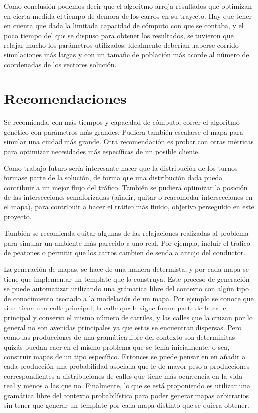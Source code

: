 \documentclass[colorinlistoftodos,twoside,twocolumn]{article} %
\begin{document}
	Como conclusi\'on podemos decir que el algoritmo arroja resultados que optimizan en cierta medida el tiempo de demora de los carros en su trayecto. Hay que tener en cuenta que dada la limitada capacidad de c\'omputo con que se contaba, y el poco tiempo del que se dispuso para obtener los resultados, se tuvieron que relajar mucho los par\'ametros utilizados. Idealmente deber\'ian haberse corrido simulaciones m\'as largas y con un tama\~no de poblaci\'on m\'as acorde al n\'umero de coordenadas de los vectores soluci\'on.

	\section{Recomendaciones}
	
	Se recomienda, con m\'as tiempos y capacidad de c\'omputo, correr el algoritmo gen\'etico con par\'ametros m\'as grandes. Pudiera tambi\'en escalarse el mapa para simular una ciudad m\'as grande. Otra recomendaci\'on es probar con otras m\'etricas para optimizar necesidades m\'as espec\'ificas de un posible cliente.
	
	Como trabajo futuro ser\'ia interesante hacer que la distribuci\'on de los turnos formase parte de la soluci\'on, de forma que una distribuci\'on dada pueda contribuir a un mejor flujo del tr\'afico. Tambi\'en se pudiera optimizar la posici\'on de las intersecciones semaforizadas (a\~nadir, quitar o reacomodar intersecciones en el mapa), para contribuir a hacer el tr\'afico m\'as fluido, objetivo perseguido en este proyecto.
	
	Tambi\'en se recomienda quitar algunas de las relajaciones realizadas al problema para simular un ambiente m\'as parecido  a uno real. Por ejemplo, incluir el t\'rafico de peatones o permitir que los carros cambien de senda a antojo del conductor.
	
	La generación de mapas, se hace de una manera determista, y por cada mapa se tiene que implementar un template que lo construya. Este proceso de generación se puede automatizar utilizando una grámatica libre del contexto con algún tipo de conocimiento asociado a la modelación de un mapa. Por ejemplo se conoce que si se tiene una calle principal, la calle que le sigue forma parte de la calle principal y conserva el mismo número de carriles, y las calles que la cruzan por lo general no son avenidas principales ya que estas se encuentran dispersas. Pero como las producciones de una gramática libre del contexto son determinitas quizás puedan caer en el mismo problema que se tenía inicialmente, o sea, construir mapas de un tipo específico. Entonces se puede pensar en en a\~nadir a cada producción una probabilidad asociada que le de mayor peso a producciones correspondientes a distribuciones de calles que tiene m\'as ocurrencia en la vida real y menos a las que no. Finalmente, lo que se está proponiendo es utilizar una gramática libre del contexto probabilística para poder generar mapas arbitrarios sin tener que generar un template por cada mapa distinto que se quiera obtener.
\end{document}
